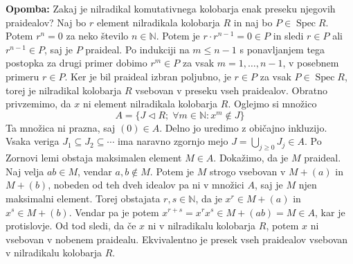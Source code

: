 \documentclass[a4paper, 12pt]{article}
\DeclareMathOperator{\Spec}{Spec}
\newcommand{\N}{\mathbb{N}}
\newcommand{\subideal}{\vartriangleleft}
\begin{document}
\begin{enumerate}[label=(\alph*)]
	\textbf{Opomba:} Zakaj je nilradikal komutativnega kolobarja enak preseku njegovih praidealov?
	 Naj bo $r$ element nilradikala kolobarja $R$ in naj bo $P \in \Spec R$. Potem $r^n = 0$ za neko število $n \in \N$. Potem je $r \cdot r^{n-1} = 0 \in P$ in sledi $r \in P$ ali $r^{n-1} \in P$, saj je $P$ praideal. Po indukciji na $m \leq n-1$ s ponavljanjem tega postopka za drugi primer dobimo $r^m \in P$ za vsak $m = 1,\dots, n-1$, v posebnem primeru $r \in P$. Ker je bil praideal izbran poljubno, je $r \in P$ za vsak $P \in \Spec R$, torej je nilradikal kolobarja $R$ vsebovan v preseku vseh praidealov.
	 Obratno privzemimo, da $x$ ni element nilradikala kolobarja $R$. Oglejmo si množico
	 \[
	 A = \lbrace J \subideal R ;\; \forall m \in \N\colon x^m \notin J\rbrace
	 \]
	 Ta množica ni prazna, saj $(0) \in A$. Delno jo uredimo z običajno inkluzijo. Vsaka veriga $J_1\subseteq J_2 \subseteq \cdots$ ima naravno zgornjo mejo $J = \bigcup_{j\geq 0} J_j \in A$. Po Zornovi lemi obstaja maksimalen element $M \in A$. Dokažimo, da je $M$ praideal. Naj velja $ab\in M$, vendar $a, b \notin M$. Potem je $M$ strogo vsebovan v $M + (a)$ in $M + (b)$, nobeden od teh dveh idealov pa ni v množici $A$, saj je $M$ njen maksimalni element. Torej obstajata $r, s \in \N$, da je $x^r \in M + (a)$ in $x^s \in M + (b)$. Vendar pa je potem $x^{r+s} = x^rx^s \in M + (ab) = M \in A$, kar je protislovje. Od tod sledi, da če $x$ ni v nilradikalu kolobarja $R$, potem $x$ ni vsebovan v nobenem praidealu. Ekvivalentno je presek vseh praidealov vsebovan v nilradikalu kolobarja $R$.
\end{enumerate}
\end{document}
